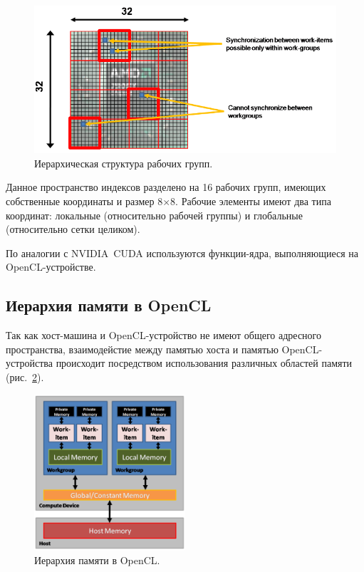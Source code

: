 \begin{figure}[p]
\centering
\includegraphics[width=1\textwidth]{include/graphics/image4}
\caption{Иерархическая структура рабочих групп.}
\label{fig:WorkGroupsStructure}
\end{figure}

Данное пространство индексов разделено на 16 рабочих групп, имеющих
собственные координаты и размер 8$ \times $8. Рабочие элементы имеют два типа координат: локальные (относительно рабочей группы) и глобальные (относительно сетки целиком).

По аналогии с NVIDIA~CUDA используются функции-ядра, выполняющиеся на OpenCL-устройстве.

\subsection{Иерархия памяти в OpenCL}

Так как хост-машина и OpenCL-устройство не имеют общего адресного
пространства, взаимодейстие между памятью хоста и памятью OpenCL-
устройства происходит посредством использования различных областей памяти (рис.~\ref{fig:OpenCLMemoryStructure}).

\begin{figure}[p]
\centering
\includegraphics[width=0.5\textwidth]{include/graphics/image5}
\caption{Иерархия памяти в OpenCL.}
\label{fig:OpenCLMemoryStructure}
\end{figure}

